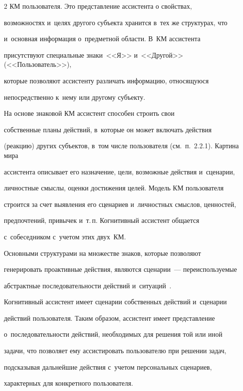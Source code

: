 \begin{multicols}{2}
КМ пользователя. Это представление ассистента о свойствах, 


возможностях и~целях другого субъекта хранится в~тех же структурах, что 


и~основная информация о~предметной об\-ласти. В~КМ ассистента 


присутствуют специальные знаки~<<Я>> и~<<Другой>> (<<Пользователь>>), 


которые позволяют ассистенту различать информацию, относящуюся 


непосредственно к~нему или другому субъекту.


  


  На основе знаковой КМ ассистент способен строить свои 


собственные планы действий, в~которые он может включать действия 


(реакцию) других субъектов, в~том числе пользователя (см.\ п.~2.2.1). Картина мира 


ассистента описывает его назначение, цели, возможные действия и~сценарии, 


личностные смыслы, оценки достижения целей. Модель КМ пользователя 


строится за счет выявления его сценариев и~личностных смыслов, ценностей, 


предпочтений, привычек и~т.\,п. Когнитивный ассистент общается 


с~собеседником с~учетом этих двух~КМ.


  


  Основными структурами на множестве знаков, которые позволяют 


генерировать проактивные действия, являются сценарии~--- переиспользуемые 


абстрактные последовательности действий и~ситуаций~\cite{2-sm}. 


Когнитивный ассистент имеет сценарии собственных действий и~сценарии 


действий пользователя. Таким образом, ассистент имеет представление 


о~последовательности действий, необходимых для решения той или иной 


задачи, что позволяет ему ассистировать пользователю при решении задач, 


подсказывая дальнейшие действия с~учетом персональных сценариев, 


характерных для конкретного пользователя.



\end{multicols}
